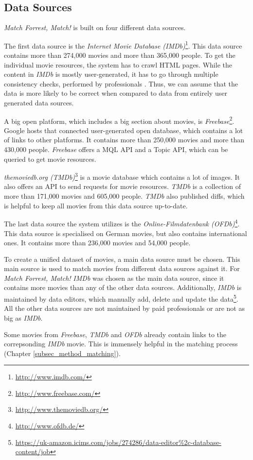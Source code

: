 \subsection{Data Sources}
\label{subsec_method_datasources}

\emph{Match Forrest, Match!} is built on four different data sources.

The first data source is the \textit{Internet Movie Database (IMDb)}\footnote{\url{http://www.imdb.com/}}.
This data source contains more than 274,000 movies and more than 365,000 people.
To get the individual movie resources, the system has to crawl HTML pages.
While the content in \textit{IMDb} is mostly user-generated, it has to go through multiple consistency checks, performed by professionals \cite{IMDb_DataCreation}.
Thus, we can assume that the data is more likely to be correct when compared to data from entirely user generated data sources.

A big open platform, which includes a big section about movies, is \textit{Freebase}\footnote{\url{http://www.freebase.com/}}.
Google hosts that connected user-generated open database, which contains a lot of links to other platforms.
It contains more than 250,000 movies and more than 430,000 people.
\textit{Freebase} offers a MQL API and a Topic API, which can be queried to get movie resources.

\textit{themoviedb.org (TMDb)}\footnote{\url{http://www.themoviedb.org/}} is a movie database which contains a lot of images.
It also offers an API to send requests for movie resources.
\textit{TMDb} is a collection of more than 171,000 movies and 605,000 people.
\textit{TMDb} also published diffs, which is helpful to keep all movies from this data source up-to-date.

The last data source the system utilizes is the \textit{Online-Filmdatenbank (OFDb)}\footnote{\url{http://www.ofdb.de/}}.
This data source is specialised on German movies, but also contains international ones.
It contains more than 236,000 movies and 54,000 people.

To create a unified dataset of movies, a main data source must be chosen.
This main source is used to match movies from different data sources against it.
For \emph{Match Forrest, Match!} \textit{IMDb} was chosen as the main data source, since it contains more movies than any of the other data sources.
Additionally, \textit{IMDb} is maintained by data editors, which manually add, delete and update the data\footnote{\url{https://uk-amazon.icims.com/jobs/274286/data-editor\%2c-database-content/job}}.
All the other data sources are not maintained by paid professionals or are not as big as \textit{IMDb}.

Some movies from \textit{Freebase}, \textit{TMDb} and \textit{OFDb} already contain links to the correpsonding \textit{IMDb} movie.
This is immensely helpful in the matching process (Chapter \ref{subsec_method_matching}).